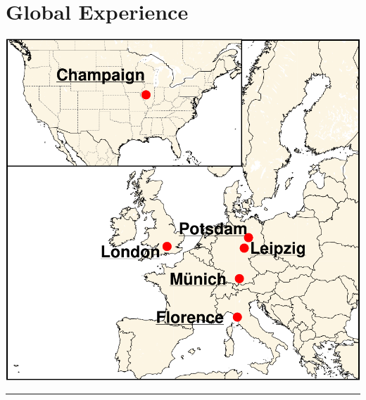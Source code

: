 \documentclass{article}
\begin{document}
\begin{minipage}[t]{0.28\textwidth}
	\centering
	\section*{\hfill \fontsize{18pt}{24pt}\selectfont \color{pblue} Global Experience}
	\vspace{-2mm}
	\includegraphics[trim=0cm 0cm 0cm 0cm, clip,scale=0.38]{../img/globalEXPENG.pdf}
	\vspace{2mm}
	\hrule
	\vspace{-3mm}

\end{minipage}
\end{document}
